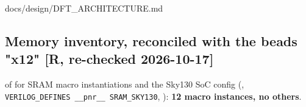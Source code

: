 \begin{relocated}{docs/design/DFT_ARCHITECTURE.md}
\subsection{Memory inventory, reconciled with the
bead\textquotesingle s "x12" {[}R, re-checked 2026-10-17{]}}\label{tm:ch:dft-architecture:161-memory-inventory-reconciled-with-the-beads-x12-r-re-checked-2026-10-17}

 of  for SRAM macro instantiations and the Sky130
SoC config (,
\texttt{VERILOG\_\allowbreak{}DEFINES\ \_\allowbreak{}\_\allowbreak{}pnr\_\allowbreak{}\_\allowbreak{}\ SRAM\_\allowbreak{}SKY130},
): \textbf{12 macro instances, no others}.

\begin{landscape}
\footnotesize\setlength{\tabcolsep}{3pt}


\end{landscape}
\end{relocated}
